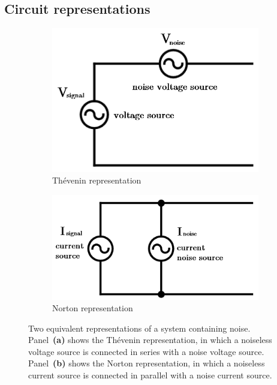 \subsection{Circuit representations}


\begin{figure}[h]
    \centering
    \begin{subfigure}[b]{.43\textwidth}
        \includegraphics[width=\textwidth]{Figures/Noise/thevenin.png}%
        \caption{Th\'evenin representation}
        \label{fig:thevenin}
    \end{subfigure}
    \begin{subfigure}[b]{.49\textwidth}
        \includegraphics[width=\textwidth]{Figures/Noise/norton.png}%
        \caption{Norton representation}
        \label{fig:norton}
    \end{subfigure}
    \caption{Two equivalent representations of a system containing noise. Panel~\textbf{(a)} shows the Th\'evenin representation, in which a noiseless voltage source is connected in series with a noise voltage source. Panel~\textbf{(b)} shows the Norton representation, in which a noiseless current source is connected in parallel with a noise current source.}
\end{figure}

